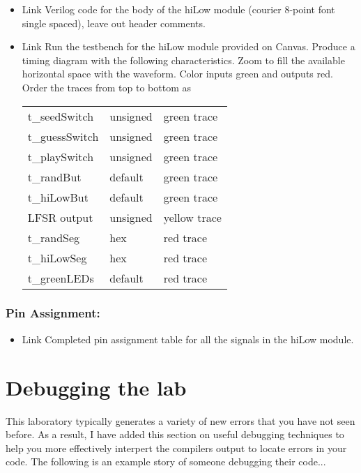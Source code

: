 \begin{itemize}
\item
  Link Verilog code for the body of the hiLow module (courier 8-point
  font single spaced), leave out header comments.
\item
  Link Run the testbench for the hiLow module provided on Canvas.
  Produce a timing diagram with the following characteristics. Zoom to
  fill the available horizontal space with the waveform. Color inputs
  green and outputs red. Order the traces from top to bottom as

\begin{tabular}{p{4cm}p{4cm}p{4cm}}
    t\_seedSwitch & unsigned  & green trace \\
    t\_guessSwitch & unsigned & green trace \\
    t\_playSwitch & unsigned & green trace \\
    t\_randBut & default & green trace \\
    t\_hiLowBut & default & green trace \\
    LFSR output & unsigned & yellow trace\\
    t\_randSeg & hex & red trace \\
    t\_hiLowSeg & hex & red trace \\
    t\_greenLEDs & default & red trace \\
  \end{tabular}
\end{itemize}

\subsubsection{Pin Assignment:}

\begin{itemize}
\item
  Link Completed pin assignment table for all the signals in the hiLow
  module.
\end{itemize}


\section{Debugging the lab}
This laboratory typically generates a variety of new errors that you 
have not seen before.  As a result, I have added this section on 
useful debugging techniques to help you more effectively 
interpert the compilers output to locate errors in your code.
The following is an example story of someone debugging their code...

